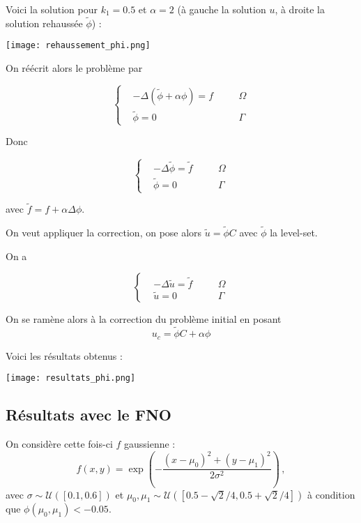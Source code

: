 Voici la solution pour $k_1=0.5$ et $\alpha=2$ (à gauche la solution $u$, à droite la solution rehaussée $\tilde{\phi}$) :

\begin{minipage}{\linewidth}
	\centering
	\texttt{[image: rehaussement\_phi.png]}
\end{minipage}

On réécrit alors le problème par

$$\left\{\begin{aligned}
	&-\Delta (\tilde{\phi}+\alpha\phi)=f \quad &&\Omega \\
	&\tilde{\phi}=0 \quad &&\Gamma
\end{aligned}\right.$$

Donc

$$\left\{\begin{aligned}
	&-\Delta \tilde{\phi}=\tilde{f} \quad &&\Omega \\
	&\tilde{\phi}=0 \quad &&\Gamma
\end{aligned}\right.$$

avec $\tilde{f}=f+\alpha\Delta\phi$.

On veut appliquer la correction, on pose alors $\tilde{u}=\tilde{\phi}C$
avec $\tilde{\phi}$ la level-set.

On a 

$$\left\{\begin{aligned}
	&-\Delta \tilde{u}=\tilde{f} \quad &&\Omega \\
	&\tilde{u}=0 \quad &&\Gamma
\end{aligned}\right.$$

On se ramène alors à la correction du problème initial en posant
$$u_c = \tilde{\phi}C+\alpha\phi$$

Voici les résultats obtenus :

\begin{minipage}{\linewidth}
	\centering
	\texttt{[image: resultats\_phi.png]}
\end{minipage}

\subsection{Résultats avec le FNO}

On considère cette fois-ci $f$ gaussienne :
$$f(x,y) = \exp\left(-\frac{(x-\mu_0)^2 + (y-\mu_1)^2}{2\sigma^2}\right)\,, $$ 
avec $\sigma \sim \mathcal{U}([0.1,0.6])$ et $\mu_0, \mu_1 \sim \mathcal{U}([0.5-\sqrt{2}/4, 0.5+\sqrt{2}/4])$ à condition que $\phi(\mu_0, \mu_1) < -0.05$. \\


